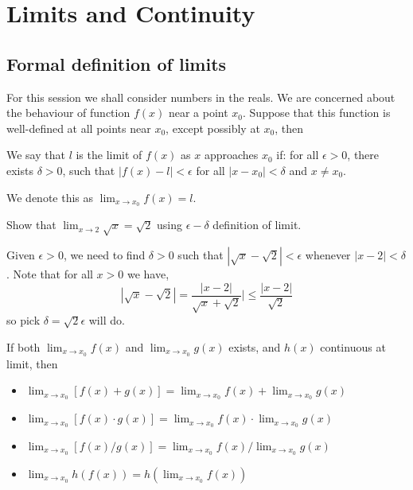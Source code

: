 \documentclass[11pt]{article}
\begin{document}
\maketitle{}
\tableofcontents{}
\pagebreak

\section{Limits and Continuity}
\subsection{Formal definition of limits}
For this session we shall consider numbers in the reals. We are concerned about the behaviour of function \(f(x)\) near a point \(x_0\). Suppose that this function is well-defined at all points near \(x_0\), except possibly at \(x_0\), then
\begin{definition}
  We say that \(l\) is the limit of \(f(x)\) as \(x\) approaches \(x_0\) if: for all \(\epsilon >0\), there exists \(\delta > 0\), such that \(|f(x)-l|<\epsilon\) for all \(|x-x_0|<\delta\) and \(x \neq x_0\). 
  
  We denote this as \(\lim_{x\to x_0}f(x)=l\).
\end{definition}

\begin{example}
  Show that \(\lim_{x\to2}\sqrt{x} = \sqrt{2}\) using \(\epsilon-\delta\) definition of limit.
\end{example}
\begin{solution}
  Given \(\epsilon > 0\), we need to find \(\delta>0\) such that \(|\sqrt{x}-\sqrt{2}|<\epsilon\) whenever \(|x-2|<\delta\). Note that for all \(x>0\) we have,
  \[|\sqrt{x}-\sqrt{2}|=\frac{|x-2|}{\sqrt{x}+\sqrt{2}}|\leq \frac{|x-2|}{\sqrt{2}}\]
  so pick \(\delta = \sqrt{2}\epsilon\) will do.
\end{solution}

\begin{proposition}
  If both \(\lim_{x\to x_0}f(x)\) and \(\lim_{x\to x_0}g(x)\) exists, and \(h(x)\) continuous at limit, then
  \begin{itemize}
    \item \(\lim_{x\to x_0}[f(x)+g(x)] = \lim_{x\to x_0}f(x) + \lim_{x\to x_0}g(x)\)
    \item \(\lim_{x\to x_0}[f(x) \cdot g(x)] = \lim_{x\to x_0}f(x) \cdot \lim_{x\to x_0}g(x)\)
    \item \(\lim_{x\to x_0}[f(x)/g(x)] = \lim_{x\to x_0}f(x) / \lim_{x\to x_0}g(x)\)
    \item \(\lim_{x\to x_0}h(f(x)) = h(\lim_{x\to x_0}f(x))\)
  \end{itemize}
\end{proposition}
\end{document}
